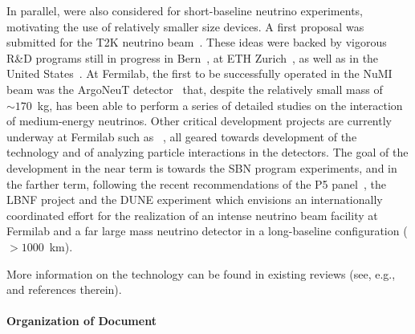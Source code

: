 In parallel, \lartpcs were also considered for short-baseline neutrino experiments, motivating the use of relatively smaller size devices. A first proposal was submitted for the T2K neutrino beam~\cite{Ereditato:2005,Ereditato:2006}.  These ideas were backed by vigorous R\&D programs still in progress in Bern~\cite{Rossi:2009-UVlaser,Badhrees:2012-argontube,Ereditato:2013-argontube,Zeller:2013-argontube}, at ETH Zurich~\cite{Horikawa:2010-ethz,Badertscher:2011-ethz,Badertscher:2012-ethz,Cantini:2013-ethz}, as well as in the United States~\cite{Baller:2014-USlarrd}. At Fermilab, the first \lartpc to be successfully operated in the NuMI beam was the ArgoNeuT detector~\cite{Anderson:2012-argoneut,Acciarri:2013-argoneut-recomb,Anderson:2012-argoneut-CCincl,Acciarri:2014-argoneut-CCxsec,Acciarri:2014-argoneut-CCcohpi} that, despite the relatively small mass of $\sim170$~kg, has been able to perform a series of detailed studies on the interaction of medium-energy neutrinos\cite{argoneutpapers}.  Other critical development projects are currently underway at Fermilab such as ~\cite{Cavanna:2014-lariat,Szelc:2013-lariatlight,Adamowski:2014-LAPD,Rebel:2011-MTS,Montanari:2013-35ton}, all geared towards development of the technology and of analyzing particle interactions in the detectors.   The goal of the development in the near term is towards the SBN program experiments, and in the farther term, following the recent recommendations of the P5 panel~\cite{P5:2014}, the LBNF project and the DUNE experiment which envisions an internationally coordinated effort for the realization of an intense neutrino beam facility at Fermilab and a far large mass neutrino detector in a long-baseline configuration ($>1000$~km). 

More information on the \lartpc technology can be found in existing reviews (see, e.g.,~\cite{Marchionni:2013} and references therein).
 
 \paragraph{Organization of Document}


